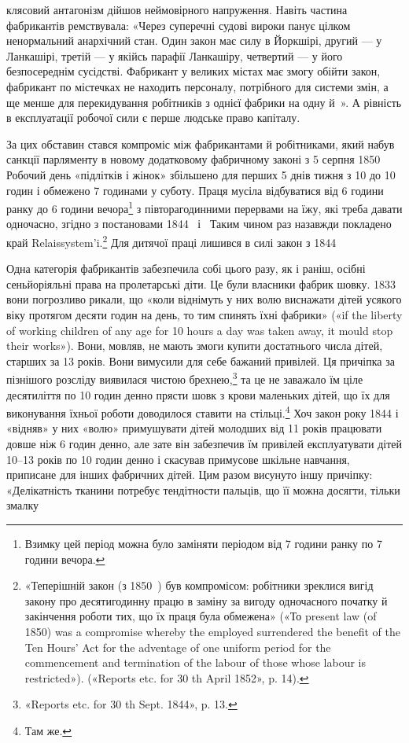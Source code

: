 \parcont{}  %
клясовий антагонізм дійшов неймовірного напруження. Навіть
частина фабрикантів ремствувала: «Через суперечні судові
вироки панує цілком ненормальний анархічний стан. Один закон
має силу в Йоркшірі, другий — у Ланкашірі, третій — у якійсь
парафії Ланкашіру, четвертий — у його безпосереднім сусідстві.
Фабрикант у великих містах має змогу обійти закон, фабрикант
по містечках не находить персоналу, потрібного для системи змін,
а ще менше для перекидування робітників з однієї фабрики на
одну й~». А рівність в експлуатації робочої сили є перше
людське право капіталу.

За цих обставин стався компроміс між фабрикантами й робітниками,
який набув санкції парляменту в новому додатковому
фабричному законі з 5 серпня 1850~ Робочий день «підлітків
і жінок» збільшено для перших 5 днів тижня з 10 до 10 годин
і обмежено 7 годинами у суботу. Праця мусіла відбуватися від
6 години ранку до 6 години вечора\footnote{
Взимку цей період можна було заміняти періодом від 7 години
ранку по 7 години вечора.
} з півторагодинними перервами
на їжу, які треба давати одночасно, згідно з постановами
1844~ і~ Таким чином раз назавжди покладено край
Relaissystem’i.\footnote{
«Теперішній закон (з 1850~) був компромісом: робітники зреклися
вигід закону про десятигодинну працю в заміну за вигоду одночасного
початку й закінчення роботи тих, що їх праця була обмежена» («То
present law (of 1850) was a compromise whereby the employed surrendered
the benefit of the Ten Hours’ Act for the adventage of one uniform period
for the commencement and termination of the labour of those whose labour
is restricted»). («Reports etc. for 30 th April 1852», p. 14).
} Для дитячої праці лишився в силі закон з
1844~

Одна категорія фабрикантів забезпечила собі цього разу,
як і раніш, осібні сеньйоріяльні права на пролетарські діти. Це
були власники фабрик шовку. 1833~ вони погрозливо рикали,
що «коли віднімуть у них волю виснажати дітей усякого віку
протягом десяти годин на день, то тим спинять їхні фабрики»
(«if the liberty of working children of any age for 10 hours a day
was taken away, it mould stop their works»). Вони, мовляв, не
мають змоги купити достатнього числа дітей, старших за 13 років.
Вони вимусили для себе бажаний привілей. Ця причіпка за пізнішого
розсліду виявилася чистою брехнею,\footnote{
«Reports etc. for 30 th Sept. 1844», p. 13.
} та це не заважало
їм ціле десятиліття по 10 годин денно прясти шовк з крови
маленьких дітей, що їх для виконування їхньої роботи доводилося
ставити на стільці.\footnote{
Там же.
} Хоч закон року 1844 і «відняв» у них
«волю» примушувати дітей молодших від 11 років працювати
довше ніж 6 годин денно, але зате він забезпечив їм привілей
експлуатувати дітей 10--13 років по 10 годин денно і скасував
примусове шкільне навчання, приписане для інших фабричних
дітей. Цим разом висунуто іншу причіпку: «Делікатність тканини
потребує тендітности пальців, що її можна досягти, тільки змалку
\parbreak{}  %
